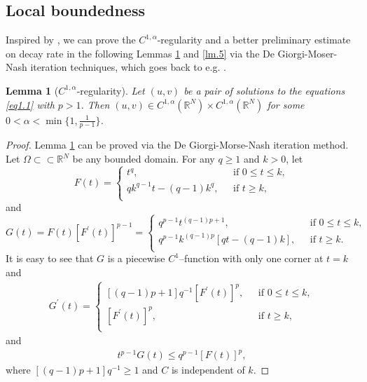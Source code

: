\documentclass[12pt]{amsart}
\newtheorem{lem}[thm]{Lemma}
\theoremstyle{definition}
\theoremstyle{remark}
\theoremstyle{conclusion}
\theoremstyle{conjecture}
\numberwithin{equation}{section}
\newcommand{\R}{\mathbb{R}}
\begin{document}
\subsection{Local boundedness}\label{sc3.1}
Inspired by \cite{CDPSYS,ED83,PT}, we can prove the $C^{1,\alpha}$-regularity and a better preliminary estimate on decay rate in the following Lemmas \ref{lm.8} and \ref{lm.5} via the De Giorgi-Moser-Nash iteration techniques, which goes back to e.g. \cite{TMOSER}.
\begin{lem}[$C^{1,\alpha}$-regularity]\label{lm.8}
Let $(u, v)$ be a pair of solutions to the equations \eqref{eq1.1} with $p>1$. Then $(u, v)\in C^{1,\alpha}(\R^N)\times C^{1,\alpha}(\R^N)$ for some $0<\alpha<\min\{1,\frac{1}{p-1}\}$.
\end{lem}
\begin{proof}
Lemma \ref{lm.8} can be proved via the De Giorgi-Morse-Nash iteration method. Let $\Omega \subset\subset \R^N$ be any bounded domain. For any $q\geq1$ and $k>0$, let
$$F(t)=\left\{ \begin{array}{ll}
                t^q,\,\,\,\,&  \mbox{if}\,\, 0\leq t\leq k, \\
                qk^{q-1}t-(q-1)k^q,\,\,\,\,&  \mbox{if}\,\, t\geq k, \\
                  \end{array}
        \right.$$
and
$$G(t)=F(t)[F^\prime(t)]^{p-1}=\left\{ \begin{array}{ll}
                q^{p-1} t^{(q-1)p+1},\,\,\,\,&  \mbox{if}\,\, 0\leq t\leq k, \\
                q^{p-1} k^{(q-1)p} [qt-(q-1)k],\,\,\,\,&  \mbox{if}\,\, t\geq k. \\
                  \end{array}
        \right.$$
It is easy to see that $G$ is a piecewise $C^1$--function with only one corner at $t=k$ and
\begin{align}\label{eq10.28.1}
 G^\prime(t)=\left\{ \begin{array}{ll}
                [(q-1)p+1]q^{-1}[F^\prime (t)]^p,\,\,\,\,&  \mbox{if}\,\, 0\leq t\leq k, \\
                {[F^\prime(t)]}^p,\,\,\,\,&  \mbox{if}\,\, t\geq k, \\
                  \end{array}
        \right.
\end{align}
and
\begin{align}\label{eq10.28.2}
 t^{p-1} G(t)\leq q^{p-1}{[F(t)]}^p,
\end{align}
where $[(q-1)p+1]q^{-1}\geq1$ and $C$ is independent of $k$.


\end{proof}
\end{document}
